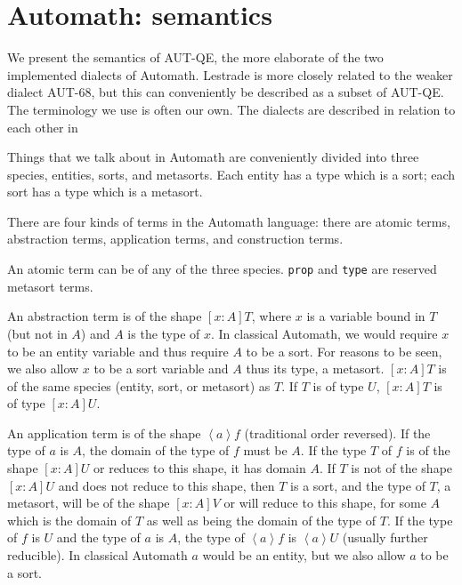 \documentclass{article}
\begin{document}
\section{Automath:  semantics}

We present the semantics of AUT-QE, the more elaborate of the two implemented dialects of Automath.  Lestrade is more closely related to the weaker dialect AUT-68, but this can conveniently be described as a subset of AUT-QE.  The terminology we use is often our own.  The dialects are described in relation to each other in \cite{vandaalena3}

Things that we talk about in Automath are conveniently divided into three species, entities, sorts, and metasorts.  Each entity has a type which is a sort;  each sort has a type which is a metasort.

There are four kinds of terms in the Automath language:  there are atomic terms, abstraction terms, application terms, and construction terms.

An atomic term can be of any of the three species.  {\tt prop} and {\tt type} are reserved metasort terms.

An abstraction term is of the shape $[x:A]T$, where $x$ is a variable bound in $T$ (but not in $A$) and $A$ is the type of $x$.  In classical Automath, we would require $x$ to be an entity variable and thus require $A$ to be a sort.  For reasons to be seen, we also allow $x$ to be a sort variable and $A$ thus its type, a metasort.  $[x:A]T$ is of the same species (entity, sort, or metasort) as $T$.  If $T$ is of type $U$,
$[x:A]T$ is of type $[x:A]U$.

An application term is of the shape $\left<a\right>f$ (traditional order reversed).  If the type of $a$ is $A$, the domain of the type of $f$ must be $A$.  If the type $T$ of $f$  is of the shape $[x:A]U$ or reduces to this shape, it has domain $A$.  If $T$ is not of the shape $[x:A]U$ and does not reduce to this shape, then $T$ is a sort, and the type of $T$, a metasort, will be of the shape $[x:A]V$ or will reduce to this shape, for some $A$ which is the domain of $T$ as well as being the domain of the type of $T$.  If the type of $f$ is $U$ and the type of $a$ is $A$, the type of $\left<a\right>f$ is $\left<a\right>U$ (usually further reducible).  In classical Automath $a$ would be an entity, but we also  allow $a$ to be a sort.
\end{document}
